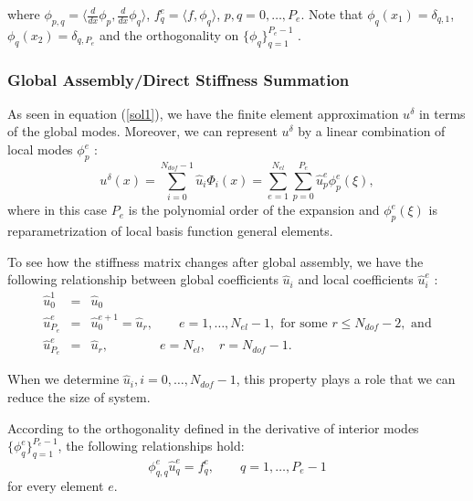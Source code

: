 where $\phi_{p,q} = \langle \frac{d}{dx} \phi_p, \frac{d}{dx}
\phi_q \rangle$, $f_q^e = \langle f, \phi_q \rangle$, $p, q = 0,
\ldots, P_e $.
Note that $\phi_q(x_1) = \delta_{q,1}$,
$\phi_q(x_2) = \delta_{q, P_e}$ and the orthogonality on
$\{\phi_q\}_{q=1}^{P_e-1}$ .

\subsubsection{Global Assembly/Direct Stiffness Summation}

As seen in equation (\ref{sol1}), we have the finite element
approximation $u^{\delta}$ in terms of the global modes. Moreover,
we can represent $u^{\delta}$ by a linear combination of local
modes ${\phi_p^e}$ :
\begin{equation}
\label{sol2} u^{\delta}(x) = \sum_{i=0}^{N_{dof}-1}\hat u_i
\Phi_i(x) = \sum_{e=1}^{N_{el}}\sum_{p=0}^{P_e}{\hat u}_p^e
\phi_p^e(\xi),
\end{equation}
where in this case $P_e$ is the polynomial order of the expansion and $\phi_p^e(\xi)$ is reparametrization of local basis function general elements.

To see how the stiffness matrix changes after global assembly, we
have the following relationship between global coefficients $\hat
u_i $ and local coefficients $\hat u_i^e$ :
\begin{eqnarray}
\label{coefoverlap}
\hat u_0^1 &=& \hat u_0 \\
\hat u_{P_{e}}^{e} &=& \hat u_{0}^{e+1} = \hat u_r, \qquad e = 1, \ldots, N_{el}-1, \mbox{ for some } r \le N_{dof}-2, \mbox{ and}\\
\hat u_{P_{e}}^{e} &=& \hat u_r, \qquad \qquad e = N_{el},\quad r = N_{dof}-1.
\end{eqnarray}

When we determine $\hat u_i, i = 0, \ldots, N_{dof}-1$, this
property plays a role that we can reduce the size of system.

According to the orthogonality defined in the derivative of
interior modes $\{\phi_q^e\}_{q=1}^{P_e-1}$, the following
relationships hold:
\begin{equation}
\label{q0}\phi_{q,q}^e \hat u_q^e = f_q^e, \qquad q = 1, \ldots, P_e-1
\end{equation}
for every element $e$.

